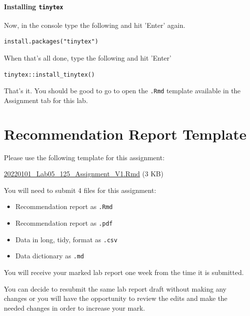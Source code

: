 \documentclass[
]{book}
\providecommand{\tightlist}{%
  \setlength{\itemsep}{0pt}\setlength{\parskip}{0pt}}
\begin{document}
\hypertarget{installing-tinytex}{%
\subsubsection*{\texorpdfstring{Installing \texttt{tinytex}}{Installing tinytex}}\label{installing-tinytex}}

Now, in the console type the following and hit 'Enter' again.

\begin{verbatim}
install.packages("tinytex")
\end{verbatim}

When that's all done, type the following and hit 'Enter'

\begin{verbatim}
tinytex::install_tinytex()
\end{verbatim}

That's it. You should be good to go to open the \texttt{.Rmd} template available in the Assignment tab for this lab.

\hypertarget{recommendation-report-template}{%
\chapter*{Recommendation Report Template}\label{recommendation-report-template}}

Please use the following template for this assignment:

\href{https://osf.io/download/kcqjs}{20220101\_Lab05\_125\_Assignment\_V1.Rmd} (3 KB)

You will need to submit 4 files for this assignment:

\begin{itemize}
\tightlist
\item
  Recommendation report as \texttt{.Rmd}
\item
  Recommendation report as \texttt{.pdf}
\item
  Data in long, tidy, format as \texttt{.csv}
\item
  Data dictionary as \texttt{.md}
\end{itemize}

You will receive your marked lab report one week from the time it is submitted.

You can decide to resubmit the same lab report draft without making any changes or you will have the opportunity to review the edits and make the needed changes in order to increase your mark.
\end{document}
